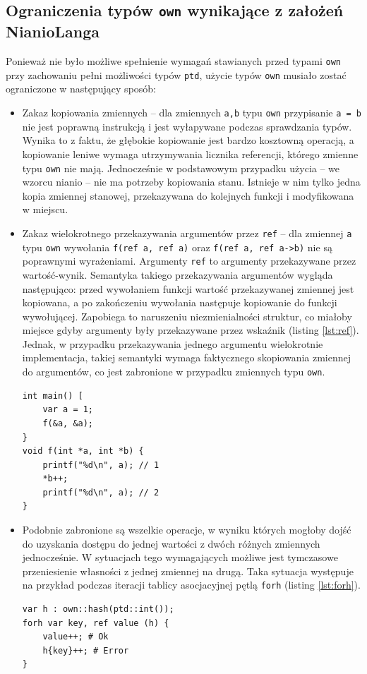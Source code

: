 \documentclass[licencjacka]{pracamgr}
\begin{document}
\subsection{Ograniczenia typów \texttt{own} wynikające z założeń NianioLanga}
Ponieważ nie było możliwe spełnienie wymagań stawianych przed typami \texttt{own} przy zachowaniu pełni
możliwości typów \texttt{ptd}, użycie typów \texttt{own} musiało zostać ograniczone w następujący sposób:
\begin{itemize}
 \item Zakaz kopiowania zmiennych -- dla zmiennych \texttt{a,b} typu \texttt{own} przypisanie
 \texttt{a = b} nie jest poprawną instrukcją i jest wyłapywane podczas sprawdzania typów.
 Wynika to z faktu, że głębokie kopiowanie jest bardzo kosztowną operacją, a kopiowanie leniwe wymaga
 utrzymywania licznika referencji, którego zmienne typu \texttt{own} nie mają.
 Jednocześnie w podstawowym przypadku użycia -- we wzorcu nianio -- nie ma potrzeby kopiowania stanu.
 Istnieje w nim tylko jedna kopia zmiennej stanowej, przekazywana do kolejnych funkcji i modyfikowana w miejscu.
 \item Zakaz wielokrotnego przekazywania argumentów przez \texttt{ref} -- dla zmiennej \texttt{a} typu
 \texttt{own} wywołania \texttt{f(ref a, ref a)} oraz \texttt{f(ref a, ref a->b)} nie są poprawnymi wyrażeniami.
 Argumenty \texttt{ref} to argumenty przekazywane przez wartość-wynik.
 Semantyka takiego przekazywania argumentów wygląda następująco: przed wywołaniem funkcji wartość przekazywanej
 zmiennej jest kopiowana, a po zakończeniu wywołania następuje kopiowanie do funkcji wywołującej.
 Zapobiega to naruszeniu niezmienialności struktur,
 co miałoby miejsce gdyby argumenty były przekazywane przez wskaźnik (listing \ref{lst:ref}).
 Jednak, w przypadku przekazywania jednego argumentu wielokrotnie implementacja, takiej semantyki wymaga
 faktycznego skopiowania zmiennej do argumentów, co jest zabronione w przypadku zmiennych typu \texttt{own}.
\begin{lstlisting}[caption={Naruszenie niezmienialności wartości w C},label={lst:ref},language=my_c]
int main() [
	var a = 1;
	f(&a, &a);
}
void f(int *a, int *b) {
	printf("%d\n", a); // 1
	*b++;
	printf("%d\n", a); // 2
}
\end{lstlisting}
 \item Podobnie zabronione są wszelkie operacje, w wyniku których mogłoby dojść do uzyskania dostępu
 do jednej wartości z dwóch różnych zmiennych jednocześnie. W sytuacjach tego wymagających możliwe jest tymczasowe
 przeniesienie własności z jednej zmiennej na drugą. Taka sytuacja występuje na przykład podczas iteracji
 tablicy asocjacyjnej pętlą \texttt{forh} (listing \ref{lst:forh}).
\begin{lstlisting}[caption={Odwołanie do zmiennej, która utraciła własność},label={lst:forh},language=nl]
var h : own::hash(ptd::int());
forh var key, ref value (h) {
	value++; # Ok
	h{key}++; # Error
}
\end{lstlisting}
\end{itemize}
\end{document}
